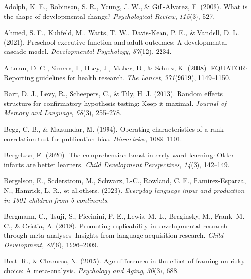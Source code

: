\documentclass[
  man]{apa6}
\newlength{\cslhangindent}
\newlength{\cslentryspacingunit} %
\newenvironment{CSLReferences}[2] %
 {%
  \setlength{\parindent}{0pt}
  \ifodd #1
  \let\oldpar\par
  \def\par{\hangindent=\cslhangindent\oldpar}
  \fi
  \setlength{\parskip}{#2\cslentryspacingunit}
 }%
 {}
\begin{document}
\hypertarget{refs}{}
\begin{CSLReferences}{1}{0}
\leavevmode{}%
Adolph, K. E., Robinson, S. R., Young, J. W., \& Gill-Alvarez, F. (2008). What is the shape of developmental change? \emph{Psychological Review}, \emph{115}(3), 527.

\leavevmode{}%
Ahmed, S. F., Kuhfeld, M., Watts, T. W., Davis-Kean, P. E., \& Vandell, D. L. (2021). Preschool executive function and adult outcomes: A developmental cascade model. \emph{Developmental Psychology}, \emph{57}(12), 2234.

\leavevmode{}%
Altman, D. G., Simera, I., Hoey, J., Moher, D., \& Schulz, K. (2008). EQUATOR: Reporting guidelines for health research. \emph{The Lancet}, \emph{371}(9619), 1149--1150.

\leavevmode{}%
Barr, D. J., Levy, R., Scheepers, C., \& Tily, H. J. (2013). Random effects structure for confirmatory hypothesis testing: Keep it maximal. \emph{Journal of Memory and Language}, \emph{68}(3), 255--278.

\leavevmode{}%
Begg, C. B., \& Mazumdar, M. (1994). Operating characteristics of a rank correlation test for publication bias. \emph{Biometrics}, 1088--1101.

\leavevmode{}%
Bergelson, E. (2020). The comprehension boost in early word learning: Older infants are better learners. \emph{Child Development Perspectives}, \emph{14}(3), 142--149.

\leavevmode{}%
Bergelson, E., Soderstrom, M., Schwarz, I.-C., Rowland, C. F., Ramirez-Esparza, N., Hamrick, L. R., et al.others. (2023). \emph{Everyday language input and production in 1001 children from 6 continents}.

\leavevmode{}%
Bergmann, C., Tsuji, S., Piccinini, P. E., Lewis, M. L., Braginsky, M., Frank, M. C., \& Cristia, A. (2018). Promoting replicability in developmental research through meta-analyses: Insights from language acquisition research. \emph{Child Development}, \emph{89}(6), 1996--2009.

\leavevmode{}%
Best, R., \& Charness, N. (2015). Age differences in the effect of framing on risky choice: A meta-analysis. \emph{Psychology and Aging}, \emph{30}(3), 688.


\end{CSLReferences}
\end{document}
